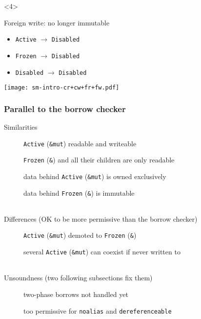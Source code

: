 \begin{frame}[t]
    \begin{onlyenv}<4>
        \begin{block}{Foreign write: no longer immutable}
            \begin{itemize}
                \item \texttt{Active} \(\to\) \texttt{Disabled}
                \item \texttt{Frozen} \(\to\) \texttt{Disabled}
                \item \texttt{Disabled} \(\to\) \texttt{Disabled}
            \end{itemize}
        \end{block}
        \texttt{[image: sm-intro-cr+cw+fr+fw.pdf]}
    \end{onlyenv}
\end{frame}

\begin{frame}
    \frametitle{Parallel to the borrow checker}
    Similarities
    \hspace{-5em}
    \begin{description}
        \item[\cmark] \texttt{Active} (\texttt{\&mut}) readable and writeable
        \item[\cmark] \texttt{Frozen} (\texttt{\&}) and all their children are only readable
        \item[\cmark] data behind \texttt{Active} (\texttt{\&mut}) is owned exclusively
        \item[\cmark] data behind \texttt{Frozen} (\texttt{\&}) is immutable
    \end{description}~\\

    Differences (OK to be more permissive than the borrow checker)
    \hspace{-5em}
    \begin{description}
        \item[\xmark] \texttt{Active} (\texttt{\&mut}) demoted to \texttt{Frozen} (\texttt{\&})
        \item[\xmark] several \texttt{Active} (\texttt{\&mut}) can coexist if never written to
    \end{description}~\\

    Unsoundness (two following subsections fix them)
    \hspace{-5em}
    \begin{description}
        \item[\xmark] two-phase borrows not handled yet
        \item[\xmark] too permissive for \texttt{noalias} and \texttt{dereferenceable}
    \end{description}~\\

\end{frame}

